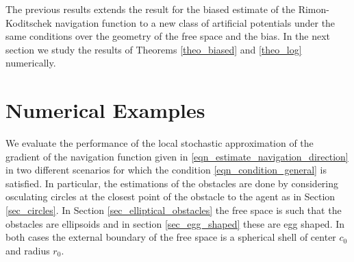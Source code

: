 \documentclass[article]{IEEEtran}
\theoremstyle{definition}
\begin{document}
%
The previous results extends the result for the biased estimate of the Rimon-Koditschek navigation function to a new class of artificial potentials under the same conditions over the geometry of the free space and the bias. In the next section we study the results of Theorems \ref{theo_biased} and \ref{theo_log} numerically. 
%
\section{Numerical Examples}\label{sec_numerical_example}
We evaluate the performance of the local stochastic approximation of the gradient of the navigation function given in \eqref{eqn_estimate_navigation_direction} in two different scenarios for which the condition \eqref{eqn_condition_general} is satisfied. In particular, the estimations of the obstacles are done by considering osculating circles at the closest point of the obstacle to the agent as in Section \ref{sec_circles}. In Section \ref{sec_elliptical_obstacles} the free space is such that the obstacles are ellipsoids and in section \ref{sec_egg_shaped} these are egg shaped. In both cases the external boundary of the free space is a spherical shell of center $c_0$ and radius $r_0$.
%
\end{document}
